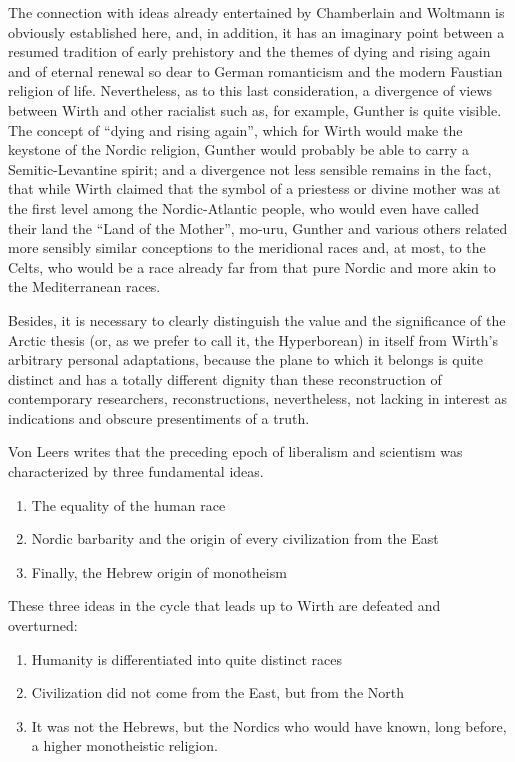\begin{quotationx}
The connection with ideas already entertained by Chamberlain and Woltmann is obviously established here, and, in addition, it has an imaginary point between a resumed tradition of early prehistory and the themes of dying and rising again and of eternal renewal so dear to German romanticism and the modern Faustian religion of life. Nevertheless, as to this last consideration, a divergence of views between Wirth and other racialist such as, for example, Gunther is quite visible. The concept of ``dying and rising again'', which for Wirth would make the keystone of the Nordic religion, Gunther would probably be able to carry a Semitic-Levantine spirit; and a divergence not less sensible remains in the fact, that while Wirth claimed that the symbol of a priestess or divine mother was at the first level among the Nordic-Atlantic people, who would even have called their land the ``Land of the Mother'', mo-uru, Gunther and various others related more sensibly similar conceptions to the meridional races and, at most, to the Celts, who would be a race already far from that pure Nordic and more akin to the Mediterranean races.

Besides, it is necessary to clearly distinguish the value and the significance of the Arctic thesis (or, as we prefer to call it, the Hyperborean) in itself from Wirth's arbitrary personal adaptations, because the plane to which it belongs is quite distinct and has a totally different dignity than these reconstruction of contemporary researchers, reconstructions, nevertheless, not lacking in interest as indications and obscure presentiments of a truth.

Von Leers writes that the preceding epoch of liberalism and scientism was characterized by three fundamental ideas.

\begin{enumerate}


\item The equality of the human race

\item Nordic barbarity and the origin of every civilization from the East

\item Finally, the Hebrew origin of monotheism
\end{enumerate}

These three ideas in the cycle that leads up to Wirth are defeated and overturned:

\begin{enumerate}


\item Humanity is differentiated into quite distinct races

\item Civilization did not come from the East, but from the North

\item It was not the Hebrews, but the Nordics who would have known, long before, a higher monotheistic religion.
\end{enumerate}
\end{quotationx}



